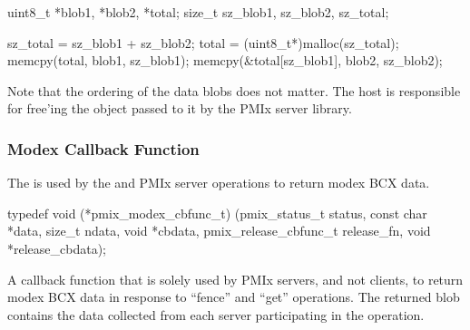 \cspecificstart
\begin{codepar}
uint8_t *blob1, *blob2, *total;
size_t sz_blob1, sz_blob2, sz_total;

sz_total = sz_blob1 + sz_blob2;
total = (uint8_t*)malloc(sz_total);
memcpy(total, blob1, sz_blob1);
memcpy(\&total[sz_blob1], blob2, sz_blob2);
\end{codepar}
\cspecificend

Note that the ordering of the data blobs does not matter. The host is responsible for free'ing the  object passed to it by the \ac{PMIx} server library.
\advicermend


\subsubsection{Modex Callback Function}

\summary

The  is used by the  and  PMIx server operations to return modex \ac{BCX} data.

\cspecificstart
\begin{codepar}
typedef void (*pmix_modex_cbfunc_t)
    (pmix_status_t status,
     const char *data, size_t ndata,
     void *cbdata,
     pmix_release_cbfunc_t release_fn,
     void *release_cbdata);
\end{codepar}
\cspecificend

\begin{arglist}
\end{arglist}

\descr

A callback function that is solely used by PMIx servers, and not clients, to return modex \ac{BCX} data in response to ``fence'' and ``get'' operations.
The returned blob contains the data collected from each server participating in the operation.


\subsection{}


